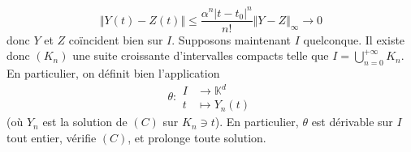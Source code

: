 \begin{demonstration}
		\[ \Vert Y(t) - Z(t) \Vert \leq \frac{\alpha^n |t-t_0|^n}{n!} \Vert Y-Z \Vert_{\infty} \longrightarrow 0 \]
		donc $Y$ et $Z$ coïncident bien sur $I$.
		\newpar
		Supposons maintenant $I$ quelconque. Il existe donc $(K_n)$ une suite croissante d'intervalles compacts telle que $I = \bigcup_{n = 0}^{+\infty} K_n$. En particulier, on définit bien l'application
		\[
		\theta :
		\begin{array}{cl}
			I &\rightarrow \mathbb{K}^d \\
			t &\mapsto Y_n(t)
		\end{array}
		\]
		(où $Y_n$ est la solution de $(C)$ sur $K_n \ni t$). En particulier, $\theta$ est dérivable sur $I$ tout entier, vérifie $(C)$, et prolonge toute solution.
	\end{demonstration}

